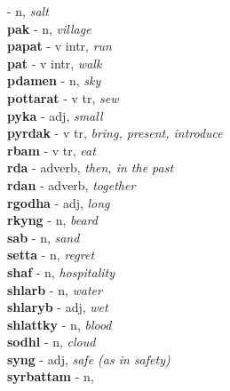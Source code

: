   - n, \emph{salt}\\ \vspace{7pt}\textbf{pak}   - n, \emph{village}\\ \vspace{7pt}\textbf{papat}   - v intr, \emph{run}\\ \vspace{7pt}\textbf{pat}   - v intr, \emph{walk}\\ \vspace{7pt}\textbf{pdamen}   - n, \emph{sky}\\ \vspace{7pt}\textbf{pottarat}   - v tr, \emph{sew}\\ \vspace{7pt}\textbf{pyka}   - adj, \emph{small}\\ \vspace{7pt}\textbf{pyrdak}   - v tr, \emph{bring, present, introduce}\\ \vspace{7pt}\textbf{rbam}   - v tr, \emph{eat}\\ \vspace{7pt}\textbf{rda}   - adverb, \emph{then, in the past}\\ \vspace{7pt}\textbf{rdan}   - adverb, \emph{together}\\ \vspace{7pt}\textbf{rgodha}   - adj, \emph{long}\\ \vspace{7pt}\textbf{rkyng}   - n, \emph{beard}\\ \vspace{7pt}\textbf{sab}   - n, \emph{sand}\\ \vspace{7pt}\textbf{setta}   - n, \emph{regret}\\ \vspace{7pt}\textbf{shaf}   - n, \emph{hospitality}\\ \vspace{7pt}\textbf{shlarb}   - n, \emph{water}\\ \vspace{7pt}\textbf{shlaryb}   - adj, \emph{wet}\\ \vspace{7pt}\textbf{shlattky}   - n, \emph{blood}\\ \vspace{7pt}\textbf{sodhl}   - n, \emph{cloud}\\ \vspace{7pt}\textbf{syng}   - adj, \emph{safe (as in safety)}\\ \vspace{7pt}\textbf{syrbattam}   - n, 